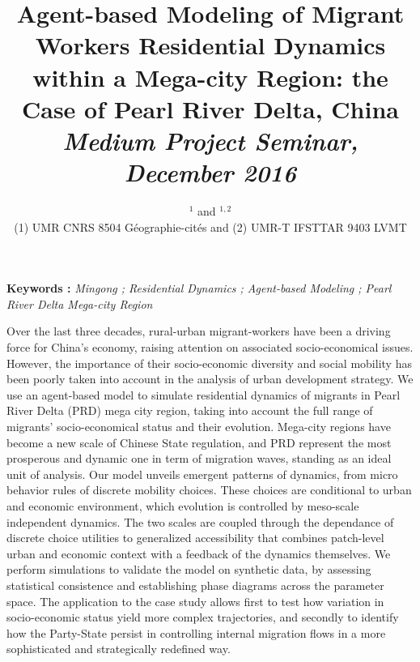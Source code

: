 


\title{Agent-based Modeling of Migrant Workers Residential Dynamics within a Mega-city Region: the Case of Pearl River Delta, China\\\bigskip
\bigskip
\bigskip
\textit{Medium Project Seminar, December 2016}
}\bigskip
\bigskip
\author{$^{1}$ and $^{1,2}$\\
\small(1) UMR CNRS 8504 Géographie-cités and (2) UMR-T IFSTTAR 9403 LVMT
}
\date{}

\maketitle

\justify




\vspace{1cm}

\textbf{Keywords : }\textit{Mingong ; Residential Dynamics ; Agent-based Modeling ; Pearl River Delta Mega-city Region}

\vspace{1.5cm}


Over the last three decades, rural-urban migrant-workers have been a driving force for China's economy, raising attention on associated socio-economical issues. However, the importance of their socio-economic diversity and social mobility has been poorly taken into account in the analysis of urban development strategy.
We use an agent-based model to simulate residential dynamics of migrants in Pearl River Delta (PRD) mega city region, taking into account the full range of migrants’ socio-economical status and their evolution. Mega-city regions have become a new scale of Chinese State regulation, and PRD represent the most prosperous and dynamic one in term of migration waves, standing as an ideal unit of analysis.
Our model unveils emergent patterns of dynamics, from micro behavior rules of discrete mobility choices. These choices are conditional to urban and economic environment, which evolution is controlled by meso-scale independent dynamics.
The two scales are coupled through the dependance of discrete choice utilities to generalized accessibility that combines patch-level urban and economic context with a feedback of the dynamics themselves.
We perform simulations to validate the model on synthetic data, by assessing statistical consistence and establishing phase diagrams across the parameter space.
The application to the case study allows first to test how variation in socio-economic status yield more complex trajectories, and secondly to identify how the Party-State persist in controlling internal migration flows in a more sophisticated and strategically redefined way.

\bigskip


\bigskip







%
%



